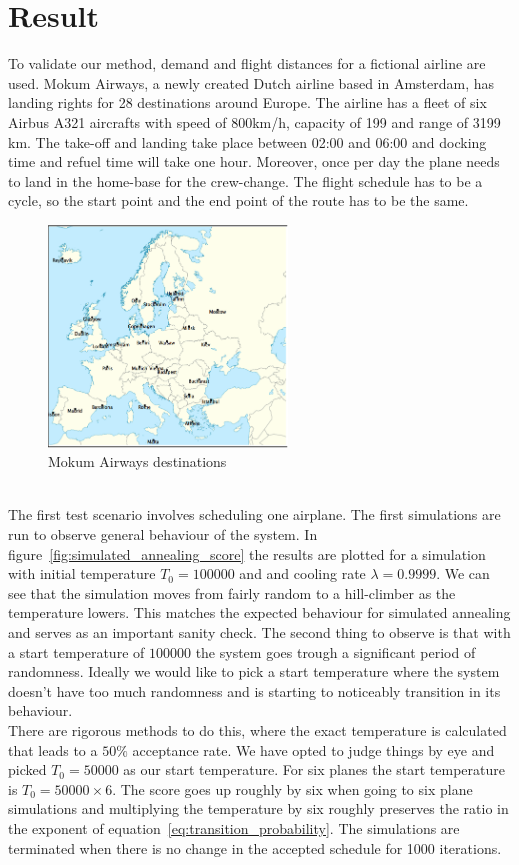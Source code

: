 \documentclass[journal]{IEEEtran}
\begin{document}
\section{Result}
To validate our method, demand and flight distances for a fictional airline are used. Mokum Airways, a newly created Dutch airline based in Amsterdam, has landing rights for 28 destinations around Europe. The airline has a fleet of six Airbus A321 aircrafts with speed of 800km/h, capacity of 199 and range of 3199 km. The take-off and landing take place between 02:00 and 06:00 and docking time and refuel time will take one hour. Moreover, once per day the plane needs to land in the home-base for the crew-change. The flight schedule has to be a cycle, so the start point and the end point of the route has to be the same.\\
\begin{figure}[!h]
\centering
\includegraphics[width=2.5in]{europe}
\caption{Mokum Airways destinations}
\label{fig:europe}
\end{figure}
\\
The first test scenario involves scheduling one airplane. The first simulations are run to observe general behaviour of the system. In figure~\ref{fig:simulated_annealing_score} the results are plotted for a simulation with initial temperature $T_0=100000$ and and cooling rate $\lambda=0.9999$. We can see that the simulation moves from fairly random to a hill-climber as the temperature lowers. This matches the expected behaviour for simulated annealing and serves as an important sanity check. The second thing to observe is that with a start temperature of $100000$ the system goes trough a significant period of randomness. Ideally we would like to pick a start temperature where the system doesn't have too much randomness and is starting to noticeably transition in its behaviour.\\
There are rigorous methods to do this, where the exact temperature is calculated that leads to a $50\%$ acceptance rate. We have opted to judge things by eye and picked $T_0=50000$ as our start temperature. For six planes the start temperature is $T_0=50000 \times 6$. The score goes up roughly by six when going to six plane simulations and multiplying the temperature by six roughly preserves the ratio in the exponent of equation~\ref{eq:transition_probability}. The simulations are terminated when there is no change in the accepted schedule for 1000 iterations. \\
\end{document}
